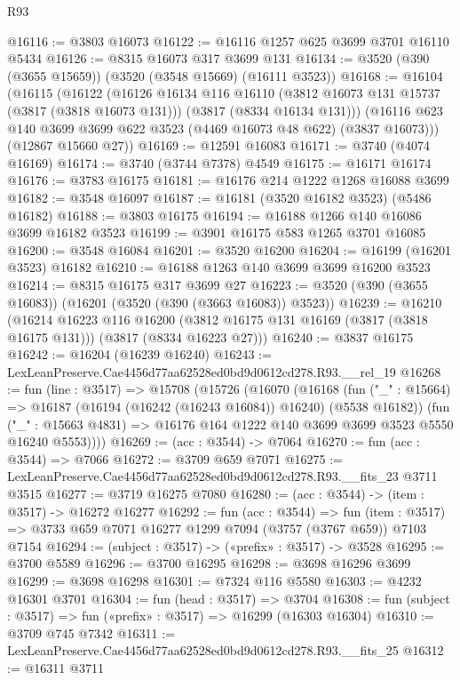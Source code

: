 \begin{lexlean}{R93}
\begin{coremodule}
@16116 := @3803 @16073
@16122 := @16116 @1257 @625 @3699 @3701 @16110 @5434
@16126 := @8315 @16073 @317 @3699 @131
@16134 := @3520 (@390 (@3655 @15659)) (@3520 (@3548 @15669) (@16111 @3523))
@16168 := @16104
    (@16115
      (@16122
        (@16126
          @16134
          @116
          @16110
          (@3812 @16073 @131 @15737 (@3817 (@3818 @16073 @131)))
          (@3817 (@8334 @16134 @131)))
        (@16116 @623 @140 @3699 @3699 @622 @3523 (@4469 @16073 @48 @622) (@3837 @16073)))
      (@12867 @15660 @27))
@16169 := @12591 @16083
@16171 := @3740 (@4074 @16169)
@16174 := @3740 (@3744 @7378) @4549
@16175 := @16171 @16174
@16176 := @3783 @16175
@16181 := @16176 @214 @1222 @1268 @16088 @3699
@16182 := @3548 @16097
@16187 := @16181 (@3520 @16182 @3523) (@5486 @16182)
@16188 := @3803 @16175
@16194 := @16188 @1266 @140 @16086 @3699 @16182 @3523
@16199 := @3901 @16175 @583 @1265 @3701 @16085
@16200 := @3548 @16084
@16201 := @3520 @16200
@16204 := @16199 (@16201 @3523) @16182
@16210 := @16188 @1263 @140 @3699 @3699 @16200 @3523
@16214 := @8315 @16175 @317 @3699 @27
@16223 := @3520 (@390 (@3655 @16083)) (@16201 (@3520 (@390 (@3663 @16083)) @3523))
@16239 := @16210
    (@16214
      @16223
      @116
      @16200
      (@3812 @16175 @131 @16169 (@3817 (@3818 @16175 @131)))
      (@3817 (@8334 @16223 @27)))
@16240 := @3837 @16175
@16242 := @16204 (@16239 @16240)
@16243 := LexLeanPreserve.Cae4456d77aa62528ed0bd9d0612cd278.R93.__rel_19
@16268 := fun (line : @3517) =>
  @15708
    (@15726
      (@16070
        (@16168
          (fun ("_" : @15664) => @16187 (@16194 (@16242 (@16243 @16084)) @16240) (@5538 @16182))
          (fun ("_" : @15663 @4831) =>
          @16176 @164 @1222 @140 @3699 @3699 @3523 @5550 @16240 @5553))))
@16269 := (acc : @3544) -> @7064
@16270 := fun (acc : @3544) => @7066
@16272 := @3709 @659 @7071
@16275 := LexLeanPreserve.Cae4456d77aa62528ed0bd9d0612cd278.R93.__fits_23 @3711 @3515
@16277 := @3719 @16275 @7080
@16280 := (acc : @3544) -> (item : @3517) -> @16272 @16277
@16292 := fun (acc : @3544) =>
  fun (item : @3517) => @3733 @659 @7071 @16277 @1299 @7094 (@3757 (@3767 @659)) @7103 @7154
@16294 := (subject : @3517) -> («prefix» : @3517) -> @3528
@16295 := @3700 @5589
@16296 := @3700 @16295
@16298 := @3698 @16296 @3699
@16299 := @3698 @16298
@16301 := @7324 @116 @5580
@16303 := @4232 @16301 @3701
@16304 := fun (head : @3517) => @3704
@16308 := fun (subject : @3517) => fun («prefix» : @3517) => @16299 (@16303 @16304)
@16310 := @3709 @745 @7342
@16311 := LexLeanPreserve.Cae4456d77aa62528ed0bd9d0612cd278.R93.__fits_25
@16312 := @16311 @3711

\end{coremodule}
\end{lexlean}
